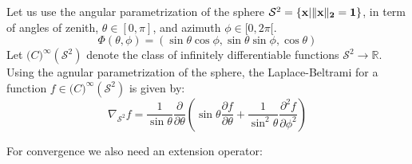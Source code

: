 \documentclass{article} %
\renewcommand{\b}[1]{{\bm{#1}}}   %
\newcommand{\1}{\b{1}}              %
\newcommand{\0}{\b{0}}              %
\newcommand{\g}[1]{\b{#1}}
\begin{document}
Let us use the angular parametrization of the sphere $\mathcal{S}^2=\{\bf{x} | \|\bf{x}\|_2=1 \}$, in term of angles of zenith, $\theta\in [0,\pi ]$, and azimuth $\phi\in [0,2\pi[$.
\begin{equation}
\Phi(\theta, \phi) = (\sin \theta \cos \phi, \sin \theta \sin \phi, \cos \theta )
\end{equation}
Let $\mathcal(C)^\infty(\mathcal{S}^2)$ denote the class of infinitely differentiable functions $\mathcal{S}^2\rightarrow \mathbb{R}$. Using the agnular parametrization of the sphere, the Laplace-Beltrami for a function $f\in \mathcal(C)^\infty(\mathcal{S}^2)$ is given by:
\begin{equation}
\nabla_{\mathcal{S}^2} f = \frac{1}{\sin \theta } \frac{\partial}{\partial \theta} \left(\sin \theta  \frac{\partial f}{\partial \theta} + \frac{1}{\sin^2 \theta} \frac{\partial^2f}{\partial \phi^2} \right)
\end{equation}


For convergence we also need an extension operator:



\end{document}
